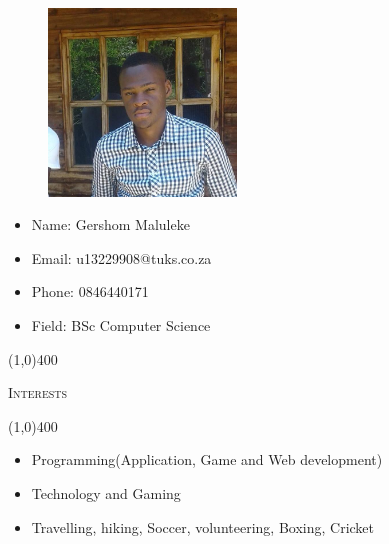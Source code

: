 \documentclass[12pt,a4paper]{report}
\begin{document}
\newpage
\vspace*{-3cm}\
\begin{minipage}{0.5\textwidth}
\begin{figure}[H]
\includegraphics[width=5cm,height=5cm,keepaspectratio]{u13229908.jpg}
\end{figure}
\end{minipage} \hfill
\begin{minipage}{0.6\textwidth}
\begin{itemize}
\item[] Name: Gershom Maluleke
\item[] Email: u13229908@tuks.co.za
\item[] Phone: 0846440171
\item[] Field: BSc Computer Science
\end{itemize}
\end{minipage}

\begin{center}
	
	\line(1,0){400}\\
	{\scshape\large Interests\par}
	\line(1,0){400}\\
	\end{center}
	\begin{itemize}
\item Programming(Application, Game and Web development)    
\item Technology and Gaming
\item  Travelling, hiking, Soccer, volunteering, Boxing, Cricket

\end{itemize}
	
\end{document}
